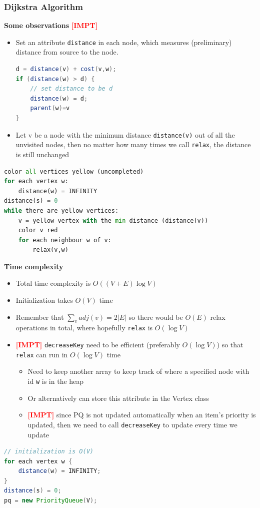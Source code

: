 \documentclass{article}
\newcommand{\impt}[0]{\textcolor{red}{\textbf{[IMPT] }}}
\begin{document}
\begin{multicols}{2}
\subsubsection{Dijkstra Algorithm}
\textbf{Some observations} \impt
\begin{itemize}
	\item Set an attribute \texttt{distance} in each node, which measures (preliminary) distance from source to the node.
	\begin{lstlisting}[language=Java]
d = distance(v) + cost(v,w);
if (distance(w) > d) {
	// set distance to be d
	distance(w) = d;
	parent(w)=v
}
\end{lstlisting}
    \item Let v be a node with the minimum distance \texttt{distance(v)} out of all the unvisited nodes, then no matter how many times we call \texttt{relax}, the distance is still unchanged
\end{itemize}
\begin{lstlisting}[language=Python]
color all vertices yellow (uncompleted)
for each vertex w:
	distance(w) = INFINITY
distance(s) = 0
while there are yellow vertices:
	v = yellow vertex with the min distance (distance(v))
	color v red
	for each neighbour w of v:
		relax(v,w)
\end{lstlisting}
\textbf{Time complexity}
\begin{itemize}
	\item Total time complexity is $O((V+E)\log{V})$
	\item Initialization takes $O(V)$ time
	\item Remember that $\sum_{v}adj(v) = 2|E|$ so there would be $O(E)$ relax operations in total, where hopefully \texttt{relax} is $O(\log{V})$
	\item \impt \texttt{decreaseKey} need to be efficient (preferably $O(\log{V})$) so that \texttt{relax} can run in $O(\log{V})$ time
	\begin{itemize}
		\item Need to keep another array to keep track of where a specified node with id \texttt{w} is in the heap
		\item Or alternatively can store this attribute in the Vertex class
		\item \impt since PQ is not updated automatically when an item's priority is updated, then we need to call \texttt{decreaseKey} to update every time we update
	\end{itemize}
\end{itemize}
\begin{lstlisting}[language=Java]
// initialization is O(V)
for each vertex w {
	distance(w) = INFINITY;
}
distance(s) = 0;
pq = new PriorityQueue(V);


\end{lstlisting}
\end{multicols}
\end{document}
